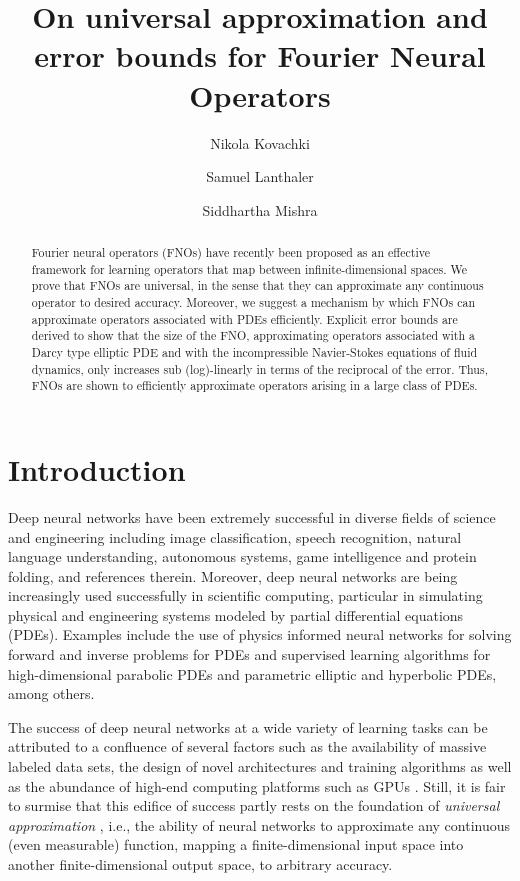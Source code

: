 \documentclass[reqno,a4paper]{amsart}
\title[Fourier Neural Operators]{
On universal approximation and error bounds for Fourier Neural Operators
}
\author{
Nikola Kovachki \and Samuel Lanthaler \and Siddhartha Mishra
}
\begin{document}
\maketitle

\begin{abstract}
Fourier neural operators (FNOs) have recently been proposed as an effective framework for learning operators that map between infinite-dimensional spaces. We prove that FNOs are universal, in the sense that they can approximate any continuous operator to desired accuracy. Moreover, we suggest a mechanism by which FNOs can approximate operators associated with PDEs efficiently. Explicit error bounds are derived to show that the size of the FNO, approximating operators associated with a Darcy type elliptic PDE and with the incompressible Navier-Stokes equations of fluid  dynamics, only increases sub (log)-linearly in terms of the reciprocal of the error. Thus, FNOs are shown to efficiently approximate operators arising in a large class of PDEs. 
\end{abstract}

\section{Introduction}
Deep neural networks have been extremely successful in diverse fields of science and engineering including image classification, speech recognition, natural language understanding, autonomous systems, game intelligence and protein folding, \cite{DLnat} and references therein. Moreover, deep neural networks are being increasingly used successfully in scientific computing, particular in simulating physical and engineering systems modeled by partial differential equations (PDEs). Examples include the use of physics informed neural networks \cite{KAR1,KAR2,MM1,MM2} for solving forward and inverse problems for PDEs and supervised learning algorithms for high-dimensional parabolic PDEs \cite{HEJ1} and parametric elliptic \cite{Kuty,SchwabZech2019} and hyperbolic \cite{LMR1,LMRS1} PDEs, among others. 

The success of deep neural networks at a wide variety of learning tasks can be attributed to a confluence of several factors such as the availability of massive labeled data sets, the design of novel architectures and training algorithms as well as the abundance of high-end computing platforms such as GPUs \cite{DLbook}. Still, it is fair to surmise that this edifice of success partly rests on the foundation of \emph{universal approximation} \cite{BAR1,Cy1,HOR1}, i.e., the ability of neural networks to approximate any continuous (even measurable) function, mapping a finite-dimensional input space into another finite-dimensional output space,  to arbitrary accuracy.
\end{document}
